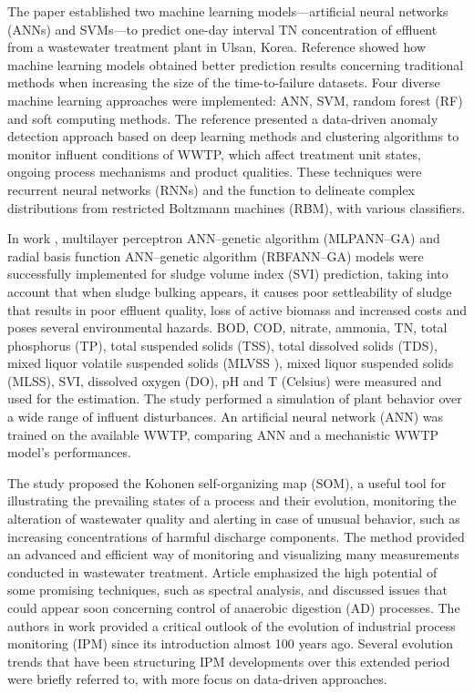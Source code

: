 The paper \cite{Guo2015} established two machine learning models—artificial neural networks (ANNs) and SVMs—to predict one-day interval TN concentration of effluent from a wastewater treatment plant in Ulsan, Korea. Reference \cite{Alsina2018} showed how machine learning models obtained better prediction results concerning traditional methods when increasing the size of the time-to-failure datasets. Four diverse machine learning approaches were implemented: ANN, SVM, random forest (RF) and soft computing methods. The reference \cite{Dairi2019} presented a data-driven anomaly detection approach based on deep learning methods and clustering algorithms to monitor influent conditions of WWTP, which affect treatment unit states, ongoing process mechanisms and product qualities. These techniques were recurrent neural networks (RNNs) and the function to delineate complex distributions from restricted Boltzmann machines (RBM), with various classifiers.

In work \cite{Bagheri2015}, multilayer perceptron ANN–genetic algorithm (MLPANN–GA) and radial basis function ANN–genetic algorithm (RBFANN–GA) models were successfully implemented for sludge volume index (SVI) prediction, taking into account that when sludge bulking appears, it causes poor settleability of sludge that results in poor effluent quality, loss of active biomass and increased costs and poses several environmental hazards. BOD, COD, nitrate, ammonia, TN, total phosphorus (TP), total suspended solids (TSS), total dissolved solids (TDS), mixed liquor volatile suspended solids (MLVSS ), mixed liquor suspended solids (MLSS), SVI, dissolved oxygen (DO), pH and T (Celsius) were measured and used for the estimation. The study \cite{Raduly2007} performed a simulation of plant behavior over a wide range of influent disturbances. An artificial neural network (ANN) was trained on the available WWTP, comparing ANN and a mechanistic WWTP model’s performances.

The study \cite{Liukkonen2013} proposed the Kohonen self-organizing map (SOM), a useful tool for illustrating the prevailing states of a process and their evolution, monitoring the alteration of wastewater quality and alerting in case of unusual behavior, such as increasing concentrations of harmful discharge components. The method provided an advanced and efficient way of monitoring and visualizing many measurements conducted in wastewater treatment. Article \cite{Jimenez2015} emphasized the high potential of some promising techniques, such as spectral analysis, and discussed issues that could appear soon concerning control of anaerobic digestion (AD) processes. The authors in work \cite{Reis2017} provided a critical outlook of the evolution of industrial process monitoring (IPM) since its introduction almost 100 years ago. Several evolution trends that have been structuring IPM developments over this extended period were briefly referred to, with more focus on data-driven approaches.

